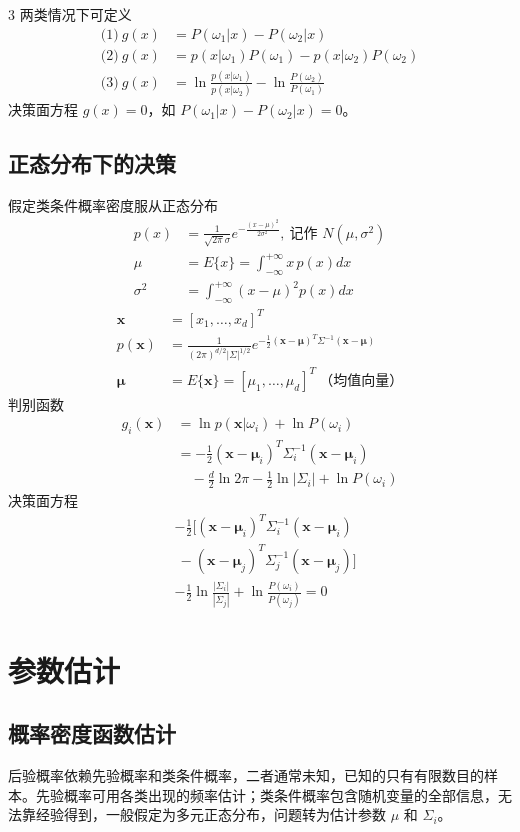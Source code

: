 \documentclass[6pt,a4paper]{extarticle}
\begin{document}
\begin{multicols}{3}
两类情况下可定义
$$\begin{aligned}
\text{(1)}\ g(x)&=P(\omega_1|x)-P(\omega_2|x)\\
\text{(2)}\ g(x)&=p(x|\omega_1)P(\omega_1)-p(x|\omega_2)P(\omega_2)\\
\text{(3)}\ g(x)&=\ln\frac{p(x|\omega_1)}{p(x|\omega_2)}-\ln\frac{P(\omega_2)}{P(\omega_1)}
\end{aligned}$$
决策面方程 $g(x)=0$，如 $P(\omega_1|x)-P(\omega_2|x)=0$。

\subsection{正态分布下的决策}
假定类条件概率密度服从正态分布
$$\begin{aligned}
p(x)&=\frac{1}{\sqrt{2\pi}\sigma}e^{-\frac{(x-\mu)^2}{2\sigma^2}},\ \text{记作 }N(\mu,\sigma^2)\\
\mu&=E\{x\}=\int_{-\infty}^{+\infty}x\,p(x)dx\\
\sigma^2&=\int_{-\infty}^{+\infty}(x-\mu)^2p(x)dx
\end{aligned}$$
$$\begin{aligned}
\mathbf{x}&=[x_1,\ldots,x_d]^T\\
p(\mathbf{x})&=\frac{1}{(2\pi)^{d/2}|\Sigma|^{1/2}}e^{-\frac12(\mathbf{x}-\bm\mu)^T\Sigma^{-1}(\mathbf{x}-\bm\mu)}\\
\bm\mu&=E\{\mathbf{x}\}=[\mu_1,\ldots,\mu_d]^T\ \text{（均值向量）}
\end{aligned}$$
判别函数
$$\begin{aligned}
g_i(\mathbf{x})&=\ln p(\mathbf{x}|\omega_i)+\ln P(\omega_i)\\
&=-\tfrac12(\mathbf{x}-\bm\mu_i)^T\Sigma_i^{-1}(\mathbf{x}-\bm\mu_i)\\
&\quad-\tfrac d2\ln2\pi-\tfrac12\ln|\Sigma_i|+\ln P(\omega_i)
\end{aligned}$$
决策面方程
$$\begin{aligned}
&-\tfrac12\big[(\mathbf{x}-\bm\mu_i)^T\Sigma_i^{-1}(\mathbf{x}-\bm\mu_i)\\
&\ -(\mathbf{x}-\bm\mu_j)^T\Sigma_j^{-1}(\mathbf{x}-\bm\mu_j)\big]\\
&-\tfrac12\ln\frac{|\Sigma_i|}{|\Sigma_j|}+\ln\frac{P(\omega_i)}{P(\omega_j)}=0
\end{aligned}$$

\section{参数估计}
\subsection{概率密度函数估计}
后验概率依赖先验概率和类条件概率，二者通常未知，已知的只有有限数目的样本。先验概率可用各类出现的频率估计；类条件概率包含随机变量的全部信息，无法靠经验得到，一般假定为多元正态分布，问题转为估计参数 $\mu$ 和 $\Sigma_i$。


\end{multicols}
\end{document}
